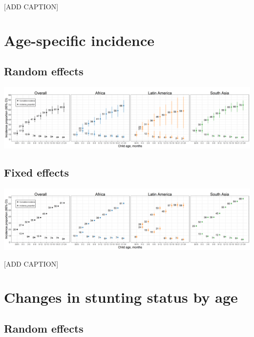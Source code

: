 \documentclass[9pt,]{book}
\begin{document}
{[}ADD CAPTION{]}

\hypertarget{age-specific-incidence-2}{%
\section{Age-specific incidence}\label{age-specific-incidence-2}}

\hypertarget{random-effects-1}{%
\subsection{Random effects}\label{random-effects-1}}

\includegraphics[width=66.67in]{figure-copies/fig-stunt-2-inc-overall_region--allage-primary}

\hypertarget{fixed-effects-2}{%
\subsection{Fixed effects}\label{fixed-effects-2}}

\includegraphics[width=66.67in]{figure-copies/fig-stunt-2-inc-overall_region--allage-fe}

{[}ADD CAPTION{]}

\hypertarget{changes-in-stunting-status-by-age}{%
\section{Changes in stunting status by age}\label{changes-in-stunting-status-by-age}}

\hypertarget{random-effects-2}{%
\subsection{Random effects}\label{random-effects-2}}
\end{document}

